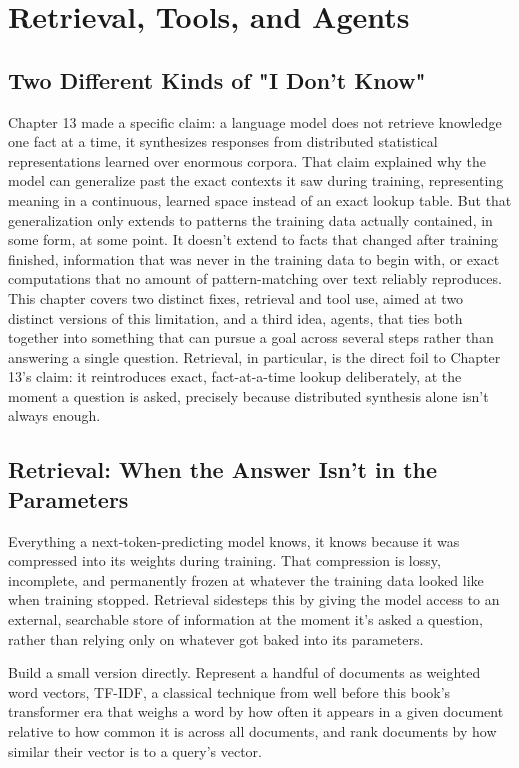 \chapter{Retrieval, Tools, and Agents}

\section*{Two Different Kinds of "I Don't Know"}

Chapter 13 made a specific claim: a language model does not retrieve knowledge one fact at a time, it synthesizes responses from distributed statistical representations learned over enormous corpora. That claim explained why the model can generalize past the exact contexts it saw during training, representing meaning in a continuous, learned space instead of an exact lookup table. But that generalization only extends to patterns the training data actually contained, in some form, at some point. It doesn't extend to facts that changed after training finished, information that was never in the training data to begin with, or exact computations that no amount of pattern-matching over text reliably reproduces. This chapter covers two distinct fixes, retrieval and tool use, aimed at two distinct versions of this limitation, and a third idea, agents, that ties both together into something that can pursue a goal across several steps rather than answering a single question. Retrieval, in particular, is the direct foil to Chapter 13's claim: it reintroduces exact, fact-at-a-time lookup deliberately, at the moment a question is asked, precisely because distributed synthesis alone isn't always enough.

\section*{Retrieval: When the Answer Isn't in the Parameters}

Everything a next-token-predicting model knows, it knows because it was compressed into its weights during training. That compression is lossy, incomplete, and permanently frozen at whatever the training data looked like when training stopped. Retrieval sidesteps this by giving the model access to an external, searchable store of information at the moment it's asked a question, rather than relying only on whatever got baked into its parameters.

Build a small version directly. Represent a handful of documents as weighted word vectors, TF-IDF, a classical technique from well before this book's transformer era that weighs a word by how often it appears in a given document relative to how common it is across all documents, and rank documents by how similar their vector is to a query's vector.

